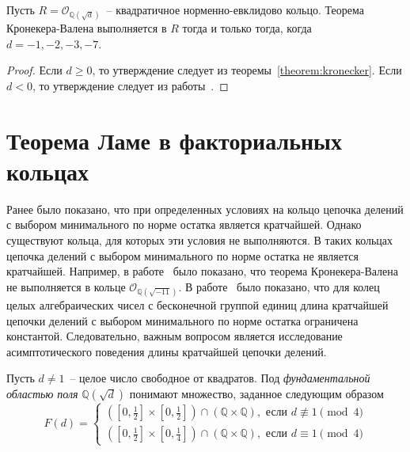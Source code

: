 \documentclass[_00_dissertation.tex]{subfiles}
\begin{document}
\begin{corollary}
    Пусть $R = \mathcal{O}_{\mathbb{Q}(\sqrt{d})}$~-- квадратичное норменно-евклидово кольцо.
    Теорема Кронекера-Валена выполняется в $R$ тогда и только тогда, когда $d=-1, -2, -3, -7$.
\end{corollary}
\begin{proof}
    Если $d \ge 0$, то утверждение следует из теоремы~\ref{theorem:kronecker}.
    Если $d < 0$, то утверждение следует из работы~\cite{source:Rolletschek_1990}.
\end{proof}

\section{Теорема Ламе в факториальных кольцах}

Ранее было показано, что при определенных условиях на кольцо цепочка делений с выбором минимального по норме остатка является кратчайшей.
Однако существуют кольца, для которых эти условия не выполняются.
В таких кольцах цепочка делений с выбором минимального по норме остатка не является кратчайшей.
Например, в работе~\cite{source:Rolletschek_1990} было показано, что теорема Кронекера-Валена не выполняется в кольце $\mathcal{O}_{\mathbb{Q}(\sqrt{-11})}$.
В работе~\cite{source:Cooke} было показано, что для колец целых алгебраических чисел с бесконечной группой единиц длина кратчайшей цепочки делений с выбором минимального по норме остатка ограничена константой.
Следовательно, важным вопросом является исследование асимптотического поведения длины кратчайшей цепочки делений.

\begin{definition}
    Пусть $d \neq 1$~-- целое число свободное от квадратов.
    Под \emph{фундаментальной областью поля} $\mathbb{Q}(\sqrt{d})$ понимают множество, заданное следующим образом
    \begin{equation*}
        F(d) = \begin{cases}
            \left(
                \left[0, \frac{1}{2}\right] \times \left[0, \frac{1}{2}\right]
            \right) \cap \left(
                \mathbb{Q} \times \mathbb{Q}
            \right), \textrm{ если } d \not\equiv 1 \pmod 4\\
            \left(
                \left[0, \frac{1}{2}\right] \times \left[0, \frac{1}{4}\right]
            \right) \cap \left(
                \mathbb{Q} \times \mathbb{Q}
            \right), \textrm{ если } d \equiv 1 \pmod 4
        \end{cases}
    \end{equation*}
\end{definition}
\end{document}
